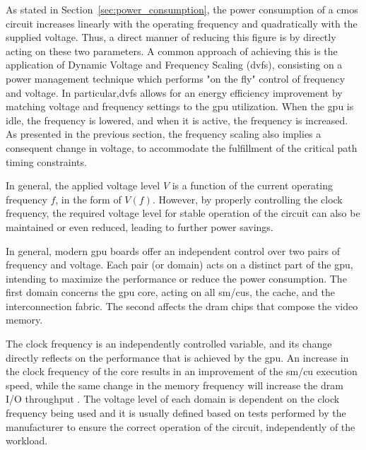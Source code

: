 As stated in Section~\ref{sec:power_consumption}, the power consumption of a \acrshort{cmos} circuit increases linearly with the operating frequency and quadratically with the supplied voltage. Thus, a direct manner of reducing this figure is by directly acting on these two parameters. A common approach of achieving this is the application of 
Dynamic Voltage and Frequency Scaling (\acrshort{dvfs}), consisting on a power management technique which performs "on the fly" control of frequency and voltage. In particular,\acrshort{dvfs} allows for an energy efficiency improvement by matching voltage and frequency settings to the \acrshort{gpu} utilization. When the \acrshort{gpu} is idle, the frequency is lowered, and when it is active, the frequency is increased. As presented in the previous section, the frequency scaling also implies a consequent change in voltage, to accommodate the fulfillment of the critical path timing constraints. 

In general, the applied voltage level $V$ is a function of the current operating frequency $f$, in the form of $V(f)$. However, by properly controlling the clock frequency, the required voltage level for stable operation of the circuit can also be maintained or even reduced, leading to further power savings.

In general, modern \acrshort{gpu} boards offer an independent control over two pairs of frequency and voltage. Each pair (or domain) acts on a distinct part of the \acrshort{gpu}, intending to maximize the performance or reduce the power consumption. The first domain concerns the \acrshort{gpu} core, acting on all \acrshort{sm}/\acrshort{cu}s, the cache, and the interconnection fabric. The second affects the \acrshort{dram} chips that compose the video memory. 

The clock frequency is an independently controlled variable, and its change directly reflects on the performance that is achieved by the \acrshort{gpu}. An increase in the clock frequency of the core results in an improvement of the \acrshort{sm}/\acrshort{cu} execution speed, while the same change in the memory frequency will increase the \acrshort{dram} I/O throughput \cite{mei_survey_2016}. The voltage level of each domain is dependent on the clock frequency being used and it is usually defined based on tests performed by the manufacturer to ensure the correct operation of the circuit, independently of the workload.

